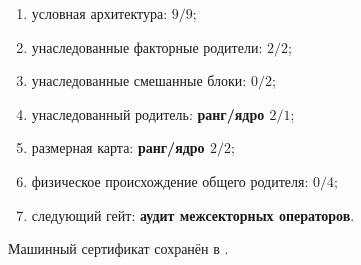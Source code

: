 \begin{protocol}\begin{enumerate}
\item условная архитектура: \textbf{$9/9$};
\item унаследованные факторные родители: \textbf{$2/2$};
\item унаследованные смешанные блоки: \textbf{$0/2$};
\item унаследованный родитель: \textbf{ранг/ядро $2/1$};
\item размерная карта: \textbf{ранг/ядро $2/2$};
\item физическое происхождение общего родителя: \textbf{$0/4$};
\item следующий гейт: \textbf{аудит межсекторных операторов}.
\end{enumerate}\end{protocol}

Машинный сертификат сохранён в
.